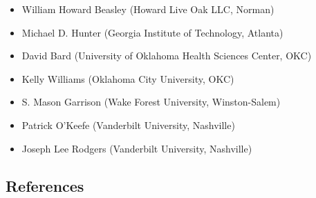\documentclass[smallextended]{svjour3}       %
\providecommand{\tightlist}{%
  \setlength{\itemsep}{0pt}\setlength{\parskip}{0pt}}
\begin{document}
\begin{itemize}
\tightlist
\item
  William Howard Beasley (Howard Live Oak LLC, Norman)
\item
  Michael D. Hunter (Georgia Institute of Technology, Atlanta)
\item
  David Bard (University of Oklahoma Health Sciences Center, OKC)
\item
  Kelly Williams (Oklahoma City University, OKC)
\item
  S. Mason Garrison (Wake Forest University, Winston-Salem)
\item
  Patrick O'Keefe (Vanderbilt University, Nashville)
\item
  Joseph Lee Rodgers (Vanderbilt University, Nashville)
\end{itemize}

\hypertarget{references}{%
\subsection{References}\label{references}}



\end{document}
